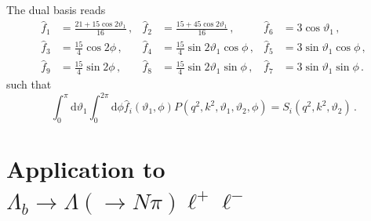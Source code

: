 \documentclass[aps,prd,reprint,nofootinbib,preprintnumbers]{revtex4}
\newcommand{\dd}{\text{d}}
\renewcommand{\theta}{\vartheta}
\begin{document}
The dual basis reads
\begin{equation}
\begin{aligned}
    \hat{f}_1 & = \frac{21 + 15 \cos 2\theta_1}{16}\,, &
    \hat{f}_2 & = \frac{15 + 45 \cos 2\theta_1}{16}\,, &
    \hat{f}_6 & = 3 \cos\theta_1                   \,, \\
    \hat{f}_3 & = \frac{15}{4}                \cos 2\phi     \,, &
    \hat{f}_4 & = \frac{15}{4} \sin 2\theta_1 \cos  \phi     \,, &
    \hat{f}_5 & = 3            \sin  \theta_1 \cos  \phi     \,, \\
    \hat{f}_9 & = \frac{15}{4}                \sin 2\phi     \,, &
    \hat{f}_8 & = \frac{15}{4} \sin 2\theta_1 \sin  \phi     \,, &
    \hat{f}_7 & = 3            \sin  \theta_1 \sin  \phi     \,.
\end{aligned}
\end{equation}
such that
\begin{equation}
    \int_0^\pi \dd\theta_1 \int_0^{2\pi}\dd \phi \hat{f}_i(\theta_1,\phi) P(q^2, k^2, \theta_1,\theta_2,\phi) = S_i(q^2, k^2, \theta_2)\,.
\end{equation}


\section{Application to $\Lambda_b\to \Lambda(\to N \pi)\ell^+\ell^-$}
\label{app:lambdabtolambdall}
\end{document}
